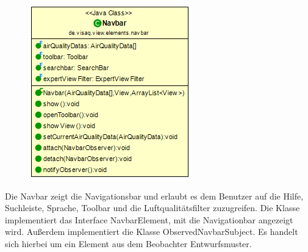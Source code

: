 \begin{minipage}{0.3\textwidth}
    \begin{figure}[H]
        \includegraphics[scale = 0.5]{media/frontend/view/de.view.elements.navbar/NavbarClass.png}
    \end{figure}
    \end{minipage} \hfill
    \begin{minipage}{0.6\textwidth}
Die Navbar zeigt die Navigationsbar und erlaubt es dem Benutzer auf die Hilfe, Suchleiste, Sprache, Toolbar und die Luftqualitätsfilter zuzugreifen.  Die Klasse implementiert das Interface NavbarElement, mit die Navigationbar angezeigt wird. Außerdem implementiert die Klasse ObservedNavbarSubject. Es handelt sich hierbei um ein Element aus dem Beobachter Entwurfsmuster.
\end{minipage}

